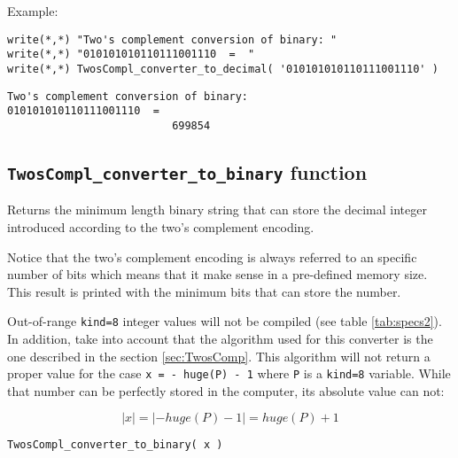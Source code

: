 Example:
\vspace{-0.5cm}
\begin{verbatim} 
write(*,*) "Two's complement conversion of binary: "
write(*,*) "010101010110111001110  =  "
write(*,*) TwosCompl_converter_to_decimal( '010101010110111001110' )
\end{verbatim} 
\vspace{-0.6cm}
\begin{verbatim} 
Two's complement conversion of binary:
010101010110111001110  =
                          699854
\end{verbatim} 

%
%
 

        \subsection{\texttt{TwosCompl\_converter\_to\_binary} function}

Returns the minimum length binary string that can store the decimal integer introduced according to the two's complement encoding.

Notice that the two's complement encoding is always referred to an specific number of bits which means that it make 
sense in a pre-defined memory size. This result is printed with the minimum bits that can store the number. 

Out-of-range \texttt{kind=8} integer values will not be compiled (see table \ref{tab:specs2}). In addition, take into account that the algorithm used for this converter is the 
one described in the section \ref{sec:TwosComp}. This algorithm will not return a proper value for the case \texttt{x = - huge(P) - 1} where \texttt{P} is a \texttt{kind=8}
variable. While that number can be perfectly stored in the computer, its absolute value can not:

\begin{equation*}
    \left|x\right| = \left|- huge(P) - 1\right|= huge(P) + 1
\end{equation*}

    \texttt{TwosCompl\_converter\_to\_binary( x )}

